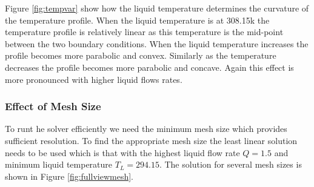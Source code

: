 \documentclass[11pt]{article}
\begin{document}
Figure \ref{fig:tempvar} show how the liquid temperature determines the curvature of the temperature profile. When the liquid temperature is at 308.15k the temperature profile is relatively linear as this temperature is the mid-point between the two boundary conditions. When the liquid temperature increases the profile becomes more parabolic and convex. Similarly as the temperature decreases the profile becomes more parabolic and concave. Again this effect is more pronounced with higher liquid flows rates.

\clearpage

\subsubsection{Effect of Mesh Size}

To runt he solver efficiently we need the minimum mesh size which provides sufficient resolution. To find the appropriate mesh size the least linear solution needs to be used which is that with the highest liquid flow rate $Q = 1.5$ and minimum liquid temperature $T_L = 294.15$. The solution for several mesh sizes is shown in Figure \ref{fig:fullviewmesh}. 
\end{document}
